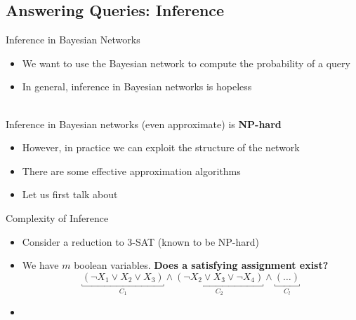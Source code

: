 \subsection{Answering Queries: Inference}

\begin{frame}{Inference in Bayesian Networks}{}
	\begin{itemize}
		\item We want to use the Bayesian network to compute the probability of a query
		\item {} In general, inference in Bayesian networks is hopeless 
	\end{itemize}
	
	\begin{boxBlue}
		 \\
		Inference in Bayesian networks (even approximate) is \textbf{NP-hard}
	\end{boxBlue}
	
	\begin{itemize}
		\item However, in practice we can exploit the structure of the network
		\item There are some effective approximation algorithms
		\item Let us first talk about 
	\end{itemize}
\end{frame}


\begin{frame}{Complexity of Inference}{}
	\begin{itemize}
		\item Consider a reduction to 3-SAT (known to be NP-hard)
		\item We have $m$ boolean variables. \textbf{Does a satisfying assignment exist?}
		\begin{equation}
			\underbracket{(\neg X_1 \vee X_2 \vee X_3)}_{C_1} \wedge
			\underbracket{(\neg X_2 \vee X_3 \vee \neg X_4)}_{C_2} \wedge \underbracket{(\dots)}_{C_l}
		\end{equation}
		\vspace*{-2mm}
		
		\item {}
	\end{itemize}
\end{frame}


